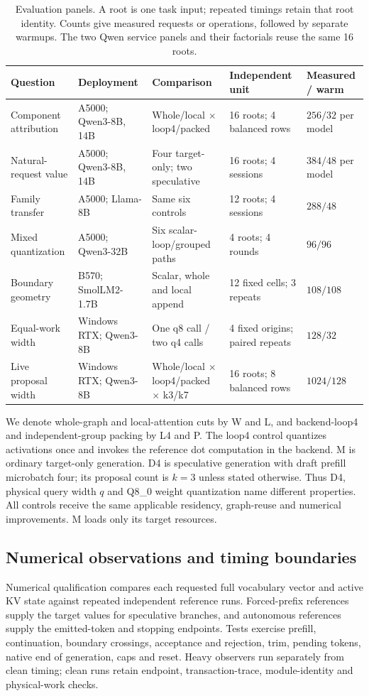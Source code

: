 \begin{table}[t]
\centering\footnotesize\tighttable
\caption{Evaluation panels. A root is one task input; repeated timings retain that root identity. Counts give measured requests or operations, followed by separate warmups. The two Qwen service panels and their factorials reuse the same 16 roots.}
\label{tab:panels}
\begin{tabularx}{\textwidth}{@{}L{2.22cm}L{2.48cm}L{2.62cm}L{2.24cm}Y@{}}\toprule
Question & Deployment & Comparison & Independent unit & Measured / warm\\\midrule
Component attribution & A5000; Qwen3-8B, 14B & Whole/local $\times$ loop4/packed & 16 roots; 4 balanced rows & $256/32$ per model\\
Natural-request value & A5000; Qwen3-8B, 14B & Four target-only; two speculative & 16 roots; 4 sessions & $384/48$ per model\\
Family transfer & A5000; Llama-8B & Same six controls & 12 roots; 4 sessions & $288/48$\\
Mixed quantization & A5000; Qwen3-32B & Six scalar-loop/grouped paths & 4 roots; 4 rounds & $96/96$\\
Boundary geometry & B570; SmolLM2-1.7B & Scalar, whole and local append & 12 fixed cells; 3 repeats & $108/108$\\
Equal-work width & Windows RTX; Qwen3-8B & One q8 call / two q4 calls & 4 fixed origins; paired repeats & $128/32$\\
Live proposal width & Windows RTX; Qwen3-8B & Whole/local $\times$ loop4/packed $\times$ k3/k7 & 16 roots; 8 balanced rows & $1024/128$\\\bottomrule
\end{tabularx}
\end{table}

We denote whole-graph and local-attention cuts by W and L, and backend-loop4 and independent-group packing by L4 and P. The loop4 control quantizes activations once and invokes the reference dot computation in the backend. M is ordinary target-only generation. D4 is speculative generation with draft prefill microbatch four; its proposal count is $k=3$ unless stated otherwise. Thus D4, physical query width $q$ and Q8\_0 weight quantization name different properties. All controls receive the same applicable residency, graph-reuse and numerical improvements. M loads only its target resources.

\subsection{Numerical observations and timing boundaries}
Numerical qualification compares each requested full vocabulary vector and active KV state against repeated independent reference runs. Forced-prefix references supply the target values for speculative branches, and autonomous references supply the emitted-token and stopping endpoints. Tests exercise prefill, continuation, boundary crossings, acceptance and rejection, trim, pending tokens, native end of generation, caps and reset. Heavy observers run separately from clean timing; clean runs retain endpoint, transaction-trace, module-identity and physical-work checks.

